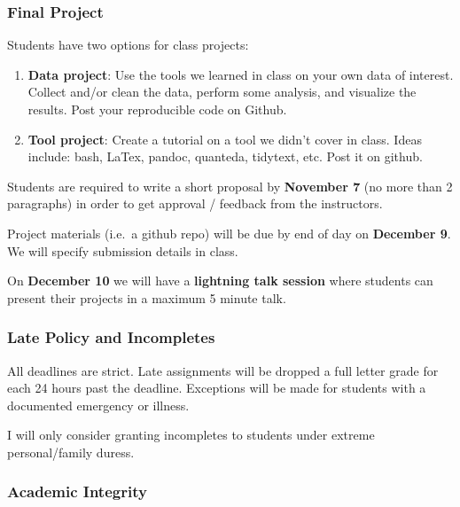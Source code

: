 \documentclass[]{book}
\begin{document}
\subsubsection*{Final Project}\label{final-project}

Students have two options for class projects:

\begin{enumerate}
\def\labelenumi{\arabic{enumi}.}
\item
  \textbf{Data project}: Use the tools we learned in class on your own
  data of interest. Collect and/or clean the data, perform some
  analysis, and visualize the results. Post your reproducible code on
  Github.
\item
  \textbf{Tool project}: Create a tutorial on a tool we didn't cover in
  class. Ideas include: bash, LaTex, pandoc, quanteda, tidytext, etc.
  Post it on github.
\end{enumerate}

Students are required to write a short proposal by \textbf{November 7}
(no more than 2 paragraphs) in order to get approval / feedback from the
instructors.

Project materials (i.e.~a github repo) will be due by end of day on
\textbf{December 9}. We will specify submission details in class.

On \textbf{December 10} we will have a \textbf{lightning talk session}
where students can present their projects in a maximum 5 minute talk.

\subsubsection*{Late Policy and
Incompletes}\label{late-policy-and-incompletes}

All deadlines are strict. Late assignments will be dropped a full letter
grade for each 24 hours past the deadline. Exceptions will be made for
students with a documented emergency or illness.

I will only consider granting incompletes to students under extreme
personal/family duress.

\subsubsection*{Academic Integrity}\label{academic-integrity}
\end{document}
